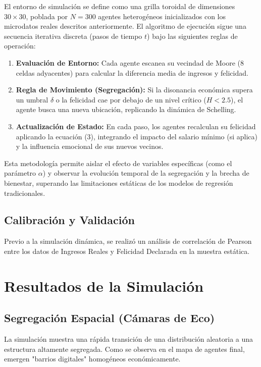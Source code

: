 \documentclass[a4paper,12pt]{article}
\begin{document}
El entorno de simulación se define como una grilla toroidal de dimensiones $30 \times 30$, poblada por $N=300$ agentes heterogéneos inicializados con los microdatos reales descritos anteriormente. El algoritmo de ejecución sigue una secuencia iterativa discreta (pasos de tiempo $t$) bajo las siguientes reglas de operación:

\begin{enumerate}
    \item \textbf{Evaluación de Entorno:} Cada agente escanea su vecindad de Moore (8 celdas adyacentes) para calcular la diferencia media de ingresos y felicidad.
    \item \textbf{Regla de Movimiento (Segregación):} Si la disonancia económica supera un umbral $\delta$ o la felicidad cae por debajo de un nivel crítico ($H < 2.5$), el agente busca una nueva ubicación, replicando la dinámica de Schelling.
    \item \textbf{Actualización de Estado:} En cada paso, los agentes recalculan su felicidad aplicando la ecuación (3), integrando el impacto del salario mínimo (si aplica) y la influencia emocional de sus nuevos vecinos.
\end{enumerate}

Esta metodología permite aislar el efecto de variables específicas (como el parámetro $\alpha$) y observar la evolución temporal de la segregación y la brecha de bienestar, superando las limitaciones estáticas de los modelos de regresión tradicionales.

\subsection{Calibración y Validación}
Previo a la simulación dinámica, se realizó un análisis de correlación de Pearson entre los datos de Ingresos Reales y Felicidad Declarada en la muestra estática.



\newpage

\section{Resultados de la Simulación}

\subsection{Segregación Espacial (Cámaras de Eco)}
La simulación muestra una rápida transición de una distribución aleatoria a una estructura altamente segregada. Como se observa en el mapa de agentes final, emergen "barrios digitales" homogéneos económicamente.
\end{document}
